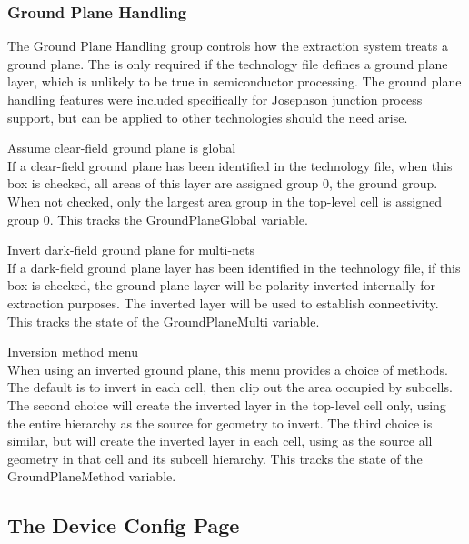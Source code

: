 \subsubsection{Ground Plane Handling}

The {\cb Ground Plane Handling} group controls how the extraction
system treats a ground plane.  The is only required if the technology
file defines a ground plane layer, which is unlikely to be true in
semiconductor processing.  The ground plane handling features were
included specifically for Josephson junction process support, but can
be applied to other technologies should the need arise.

\begin{description}
\item{\cb Assume clear-field ground plane is global}\\
If a clear-field ground plane has been identified in the technology
file, when this box is checked, all areas of this layer are assigned
group 0, the ground group.  When not checked, only the largest area
group in the top-level cell is assigned group 0.  This tracks the
{\et GroundPlaneGlobal} variable.

\item{\cb Invert dark-field ground plane for multi-nets}\\
If a dark-field ground plane layer has been identified in the
technology file, if this box is checked, the ground plane layer will
be polarity inverted internally for extraction purposes.  The inverted
layer will be used to establish connectivity.  This tracks the state
of the {\et GroundPlaneMulti} variable.

\item{\cb Inversion method menu}\\
When using an inverted ground plane, this menu provides a choice of
methods.  The default is to invert in each cell, then clip out the
area occupied by subcells.  The second choice will create the inverted
layer in the top-level cell only, using the entire hierarchy as the
source for geometry to invert.  The third choice is similar, but will
create the inverted layer in each cell, using as the source all
geometry in that cell and its subcell hierarchy.  This tracks the
state of the {\et GroundPlaneMethod} variable.
\end{description}

\subsection{The {\cb Device Config} Page}

